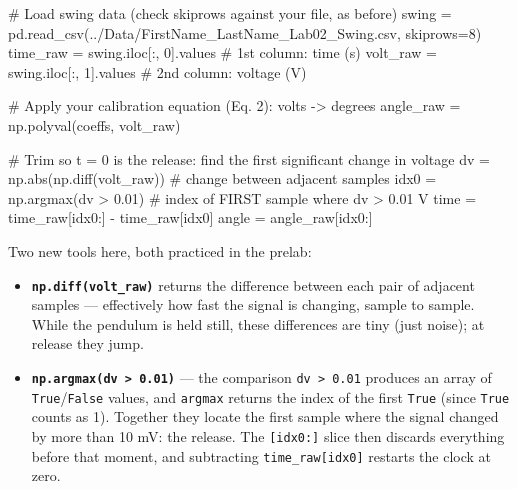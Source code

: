 \documentclass[
  12pt,
  letterpaper,
]{article}
\newenvironment{Shaded}{\begin{snugshade}}{\end{snugshade}}
\newcommand{\BuiltInTok}[1]{\textcolor[rgb]{0.00,0.23,0.31}{#1}}
\newcommand{\CommentTok}[1]{\textcolor[rgb]{0.37,0.37,0.37}{#1}}
\newcommand{\DecValTok}[1]{\textcolor[rgb]{0.68,0.00,0.00}{#1}}
\newcommand{\FloatTok}[1]{\textcolor[rgb]{0.68,0.00,0.00}{#1}}
\newcommand{\NormalTok}[1]{\textcolor[rgb]{0.00,0.23,0.31}{#1}}
\newcommand{\OperatorTok}[1]{\textcolor[rgb]{0.37,0.37,0.37}{#1}}
\newcommand{\StringTok}[1]{\textcolor[rgb]{0.13,0.47,0.30}{#1}}
\providecommand{\tightlist}{%
  \setlength{\itemsep}{0pt}\setlength{\parskip}{0pt}}
\begin{document}
\begin{Shaded}
\begin{Highlighting}[]
\CommentTok{\# Load swing data (check skiprows against your file, as before)}
\NormalTok{swing    }\OperatorTok{=}\NormalTok{ pd.read\_csv(}\StringTok{\textquotesingle{}../Data/FirstName\_LastName\_Lab02\_Swing.csv\textquotesingle{}}\NormalTok{, skiprows}\OperatorTok{=}\DecValTok{8}\NormalTok{)}
\NormalTok{time\_raw }\OperatorTok{=}\NormalTok{ swing.iloc[:, }\DecValTok{0}\NormalTok{].values     }\CommentTok{\# 1st column: time (s)}
\NormalTok{volt\_raw }\OperatorTok{=}\NormalTok{ swing.iloc[:, }\DecValTok{1}\NormalTok{].values     }\CommentTok{\# 2nd column: voltage (V)}

\CommentTok{\# Apply your calibration equation (Eq. 2): volts {-}\textgreater{} degrees}
\NormalTok{angle\_raw }\OperatorTok{=}\NormalTok{ np.polyval(coeffs, volt\_raw)}

\CommentTok{\# Trim so t = 0 is the release: find the first significant change in voltage}
\NormalTok{dv    }\OperatorTok{=}\NormalTok{ np.}\BuiltInTok{abs}\NormalTok{(np.diff(volt\_raw))      }\CommentTok{\# change between adjacent samples}
\NormalTok{idx0  }\OperatorTok{=}\NormalTok{ np.argmax(dv }\OperatorTok{\textgreater{}} \FloatTok{0.01}\NormalTok{)           }\CommentTok{\# index of FIRST sample where dv \textgreater{} 0.01 V}
\NormalTok{time  }\OperatorTok{=}\NormalTok{ time\_raw[idx0:] }\OperatorTok{{-}}\NormalTok{ time\_raw[idx0]}
\NormalTok{angle }\OperatorTok{=}\NormalTok{ angle\_raw[idx0:]}
\end{Highlighting}
\end{Shaded}

Two new tools here, both practiced in the prelab:

\begin{itemize}
\tightlist
\item
  \textbf{\texttt{np.diff(volt\_raw)}} returns the difference between
  each pair of adjacent samples --- effectively how fast the signal is
  changing, sample to sample. While the pendulum is held still, these
  differences are tiny (just noise); at release they jump.
\item
  \textbf{\texttt{np.argmax(dv\ \textgreater{}\ 0.01)}} --- the
  comparison \texttt{dv\ \textgreater{}\ 0.01} produces an array of
  \texttt{True}/\texttt{False} values, and \texttt{argmax} returns the
  index of the first \texttt{True} (since \texttt{True} counts as 1).
  Together they locate the first sample where the signal changed by more
  than 10 mV: the release. The \texttt{{[}idx0:{]}} slice then discards
  everything before that moment, and subtracting
  \texttt{time\_raw{[}idx0{]}} restarts the clock at zero.
\end{itemize}
\end{document}

